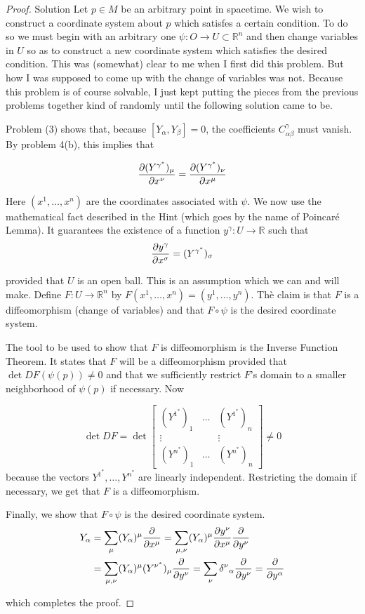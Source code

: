 \begin{proof}
    Solution Let $p\in M$ be an arbitrary point in spacetime. We wish to construct a
    coordinate system about $p$ which satisfes a certain condition. To do so we must begin with an arbitrary one $\psi:O\longrightarrow U\subset\mathbb{R}^n$ and then change variables in $U$ so as to construct a new coordinate system which satisfies the desired condition. This was (somewhat) clear to me when I first did this problem. But how I was supposed to come up with the change of variables was not. Because this problem is of course solvable, I just kept putting the pieces from the previous problems together kind of randomly until the following solution came to be.
   
    Problem (3) shows that, because $[Y_\alpha,Y_\beta]=0$, the coefficients $C^\gamma_{\alpha\beta}$ must vanish. By problem 4(b), this implies that
   
   \[
   \pdv{(Y^{\gamma^*})_\mu}{x^\nu}=\pdv{(Y^{\gamma^*})_\nu}{x^\mu}
   \]
   
    Here $( x^1, \ldots , x^n) $ are the coordinates associated with $\psi.$ We now use the mathematical fact described in the Hint (which goes by the name of Poincaré Lemma). It guarantees the existence of a function $y^\gamma:U\longrightarrow\mathbb{R}$ such that
    \[\pdv{y^\gamma}{x^\sigma}=(Y^{\gamma^*})_\sigma\]
   
    provided that $U$ is an open ball. This is an assumption which we can and will make. Define $F:U\longrightarrow\mathbb{R}^n$ by $F(x^1,\ldots,x^n)=(y^1,\ldots,y^n)$. Thè claim is that $F$ is a diffeomorphism (change of variables) and that $F\circ\psi$ is the desired coordinate system.
   
    The tool to be used to show that $F$ is diffeomorphism is the Inverse Function Theorem. It states that $F$ will be a diffeomorphism provided that $\det DF(\psi(p))\neq0$ and that we sufficiently restrict $F$'s domain to a smaller neighborhood of $\psi(p)$ if necessary. Now
   
    \[\operatorname*{det}DF=\operatorname*{det}\begin{bmatrix}
        (Y^{1^*})_1 & \ldots & (Y^{1^*})_n\\
        \vdots & & \vdots\\
        (Y^{n^*})_1 & \ldots & (Y^{n^*})_n
    \end{bmatrix}\neq 0\]
    because the vectors $Y^{1^*},\ldots,Y^{n^*}$ are linearly independent. Restricting the domain if necessary, we get that $F$ is a diffeomorphism.
   
    Finally, we show that $F\circ\psi$ is the desired coordinate system.
   \[\begin{aligned}
        Y_\alpha&=\sum_\mu(Y_\alpha)^\mu\pdv{}{x^\mu}=\sum_{\mu,\nu}(Y_\alpha)^\mu\pdv{y^\nu}{x^\mu}\pdv{}{y^\nu}\\
        &=\sum_{\mu,\nu}(Y_\alpha)^\mu(Y^{\nu^*})_\mu\pdv{}{y^\nu}=\sum_{\nu}\delta^\nu{}_\alpha\pdv{}{y^\nu}=\pdv{}{y^\alpha}
    \end{aligned}\]

    which completes the proof.
\end{proof}\newpage

